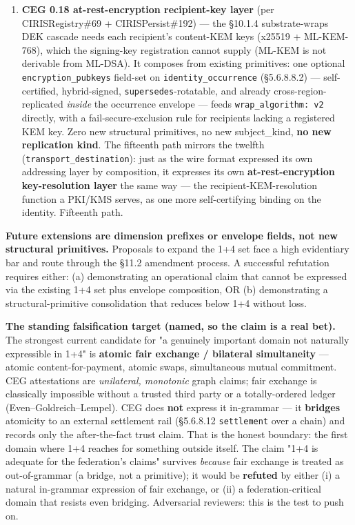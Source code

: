 \documentclass[10pt]{article}
\begin{document}
\begin{enumerate}
\item \textbf{CEG 0.18 at-rest-encryption recipient-key layer} (per CIRISRegistry\#69 + CIRISPersist\#192) — the §10.1.4 substrate-wraps DEK cascade needs each recipient's content-KEM keys (x25519 + ML-KEM-768), which the signing-key registration cannot supply (ML-KEM is not derivable from ML-DSA). It composes from existing primitives: one optional \texttt{encryption\_pubkeys} field-set on \texttt{identity\_occurrence} (§5.6.8.8.2) — self-certified, hybrid-signed, \texttt{supersedes}-rotatable, and already cross-region-replicated \textit{inside} the occurrence envelope — feeds \texttt{wrap\_algorithm: v2} directly, with a fail-secure-exclusion rule for recipients lacking a registered KEM key. Zero new structural primitives, no new subject\_kind, \textbf{no new replication kind}. The fifteenth path mirrors the twelfth (\texttt{transport\_destination}): just as the wire format expressed its own addressing layer by composition, it expresses its own \textbf{at-rest-encryption key-resolution layer} the same way — the recipient-KEM-resolution function a PKI/KMS serves, as one more self-certifying binding on the identity. Fifteenth path.
\end{enumerate}


\textbf{Future extensions are dimension prefixes or envelope fields, not new structural primitives.} Proposals to expand the 1+4 set face a high evidentiary bar and route through the §11.2 amendment process. A successful refutation requires either: (a) demonstrating an operational claim that cannot be expressed via the existing 1+4 set plus envelope composition, OR (b) demonstrating a structural-primitive consolidation that reduces below 1+4 without loss.


\textbf{The standing falsification target (named, so the claim is a real bet).} The strongest current candidate for "a genuinely important domain not naturally expressible in 1+4" is \textbf{atomic fair exchange / bilateral simultaneity} — atomic content-for-payment, atomic swaps, simultaneous mutual commitment. CEG attestations are \textit{unilateral, monotonic} graph claims; fair exchange is classically impossible without a trusted third party or a totally-ordered ledger (Even–Goldreich–Lempel). CEG does \textbf{not} express it in-grammar — it \textbf{bridges} atomicity to an external settlement rail (§5.6.8.12 \texttt{settlement} over a chain) and records only the after-the-fact trust claim. That is the honest boundary: the first domain where 1+4 reaches for something outside itself. The claim "1+4 is adequate for the federation's claims" survives \textit{because} fair exchange is treated as out-of-grammar (a bridge, not a primitive); it would be \textbf{refuted} by either (i) a natural in-grammar expression of fair exchange, or (ii) a federation-critical domain that resists even bridging. Adversarial reviewers: this is the test to push on.
\end{document}
